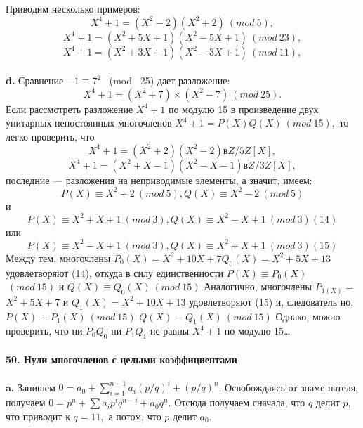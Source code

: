 \pagebreak
\noindent Приводим несколько примеров:
$$X^{4} + 1 = (X^{2} - 2 )(X^{2} + 2) ~(mod~ 5),$$
$$X^{4} + 1 = (X^{2} + 5X + 1 )(X^{2} - 5X + 1) ~(mod~ 23),$$
$$X^{4} + 1 = (X^{2} + 3X + 1 )(X^{2} - 3X + 1) ~(mod~ 11),$$
\\
\hspace*{15pt}\textbf{d.} Сравнение $-1 \equiv 7^{2}$ ~(mod~ 25) дает разложение:
$$X^{4} + 1 = (X^{2} +7) \times (X^{2} - 7) ~(mod~ 25).$$
Если рассмотреть разложение $X^{4} + 1$ по модулю 15 в произведение двух\linebreak
унитарных непостоянных многочленов $X^{4} + 1 = P(X)Q(X) ~(mod~ 15),$\linebreak
то легко проверить, что
$$X^{4} + 1 = (X^{2} + 2 )(X^{2} - 2) в Z/5Z[X],$$
$$X^{4} + 1 = (X^{2} + X - 1 )(X^{2} - X - 1) в Z/3Z[X],$$
последние --- разложения на неприводимые элементы, а значит, имеем: 
$$P(X) \equiv X^{2} + 2 ~(mod~ 5), Q(X) \equiv X^{2} - 2 ~(mod~ 5)$$
и
$$P(X) \equiv X^{2} + X + 1 ~(mod~ 3), Q(X) \equiv X^{2} - X + 1 ~(mod~ 3)   (14)$$
или
$$P(X) \equiv X^{2} - X + 1 ~(mod~ 3), Q(X) \equiv X^{2} + X + 1 ~(mod~ 3)   (15)$$
Между тем, многочлены $P_{0}(X) = X^{2} + 10X + 7   Q_{0}(X) = X^{2} + 5X + 13$\linebreak
удовлетворяют (14), откуда в силу единственности $P(X) \equiv P_{0}(X)$\linebreak
$~(mod~ 15)$ и $Q(X) \equiv Q_0(X) ~(mod~ 15)$ Аналогично, многочлены $P_{1(X)} =$\linebreak
$X^{2} + 5X + 7$ и $Q_{1}(X) = X^{2} + 10X + 13$ удовлетворяют (15) и, следователь­\linebreak
но,$P(X) \equiv P_{1}(X) ~(mod~ 15)$ $Q(X) \equiv Q_{1}(X) ~(mod~ 15)$ Однако, можно\linebreak
проверить, что ни $P_0Q_0$ ни $P_1Q_1$  не равны $X^{4} + 1$ по модулю 15\ldots\\
\\
\noindent\textbf{50. Нули многочленов с целыми коэффициентами}\\
\\
\hspace*{15pt}\textbf{a.}  Запишем $0 = a_0+\sum^{n-1}_{i=1}a_{i}(p/q)^{i} + (p/q)^{n}$. Освобождаясь от знаме­
нателя, получаем $0 = p^{n}+\sum a_{i}p^{i}q^{n-i}+a_{0}q^{n}.$ Отсюда получаем сначала, 
что $q$ делит $p$, что приводит к $q = 11,$ а потом, что $p$ делит $a_0$.
